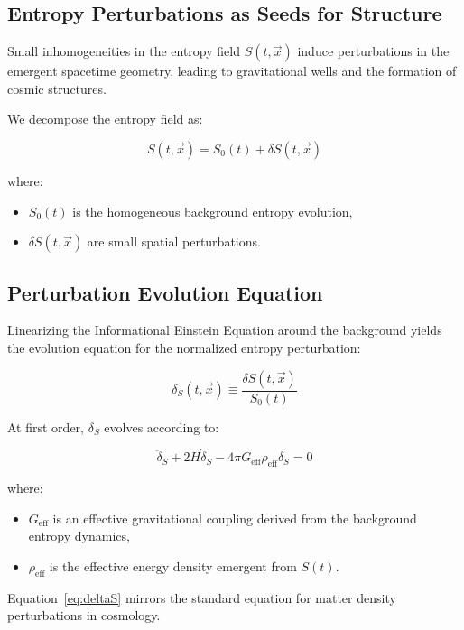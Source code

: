 \documentclass{article}
\begin{document}
\subsection{Entropy Perturbations as Seeds for Structure}

Small inhomogeneities in the entropy field $S(t, \vec{x})$ induce perturbations in the emergent spacetime geometry, leading to gravitational wells and the formation of cosmic structures.

We decompose the entropy field as:

\begin{equation}
S(t, \vec{x}) = S_0(t) + \delta S(t, \vec{x})
\end{equation}

where:
\begin{itemize}
    \item $S_0(t)$ is the homogeneous background entropy evolution,
    \item $\delta S(t, \vec{x})$ are small spatial perturbations.
\end{itemize}

\subsection{Perturbation Evolution Equation}

Linearizing the Informational Einstein Equation around the background yields the evolution equation for the normalized entropy perturbation:

\[
\delta_S(t, \vec{x}) \equiv \frac{\delta S(t, \vec{x})}{S_0(t)}
\]

At first order, $\delta_S$ evolves according to:

\begin{equation}
\ddot{\delta}_S + 2H \dot{\delta}_S - 4\pi G_{\text{eff}} \rho_{\text{eff}} \delta_S = 0
\label{eq:deltaS}
\end{equation}

where:
\begin{itemize}
    \item $G_{\text{eff}}$ is an effective gravitational coupling derived from the background entropy dynamics,
    \item $\rho_{\text{eff}}$ is the effective energy density emergent from $S(t)$.
\end{itemize}

Equation~\eqref{eq:deltaS} mirrors the standard equation for matter density perturbations in cosmology.
\end{document}
